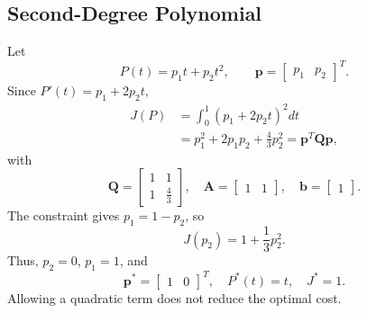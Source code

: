 \documentclass[letterpaper,10pt,conference]{IEEEtran}
\newcommand{\vect}[1]{\bm{#1}}
\begin{document}
\subsection{Second-Degree Polynomial}
Let
\begin{equation}
P(t)=p_1t+p_2t^2,
\qquad \vect{p}=\begin{bmatrix}p_1&p_2\end{bmatrix}^{T}.
\end{equation}
Since $P'(t)=p_1+2p_2t$,
\begin{align}
J(P)&=\int_0^1(p_1+2p_2t)^2dt\\
&=p_1^2+2p_1p_2+\frac{4}{3}p_2^2
=\vect{p}^{T}\vect{Q}\vect{p},
\end{align}
with
\begin{equation}
\boxed{\vect{Q}=\begin{bmatrix}1&1\\1&\frac{4}{3}\end{bmatrix}},
\quad
\boxed{\vect{A}=\begin{bmatrix}1&1\end{bmatrix}},
\quad
\boxed{\vect{b}=\begin{bmatrix}1\end{bmatrix}}.
\end{equation}
The constraint gives $p_1=1-p_2$, so
\begin{equation}
J(p_2)=1+\frac{1}{3}p_2^2.
\end{equation}
Thus, $p_2=0$, $p_1=1$, and
\begin{equation}
\boxed{\vect{p}^{*}=\begin{bmatrix}1&0\end{bmatrix}^{T},
\quad P^*(t)=t,\quad J^*=1.}
\end{equation}
Allowing a quadratic term does not reduce the optimal cost.
\end{document}
